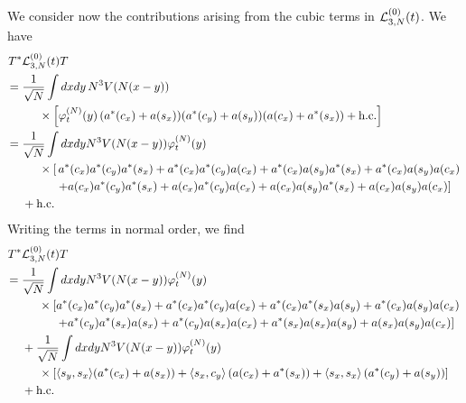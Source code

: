 \documentclass[11pt,a4paper,DIV11]{scrartcl}	%
\newcommand{\cL}{{\cal L}}
\begin{document}
We consider now the contributions arising from the cubic terms in $\cL^{(0)}_{3,N} (t)$.
We have
\[ \begin{split}
T^* & \cL_{3,N}^{(0)} (t) T \\ = \; & \frac{1}{\sqrt{N}} \int dx dy \, N^3 V(N (x-y)) \\ &\hspace{.5cm} \times \left[ \varphi_t^{(N)} (y) \, ( a^* (c_x) + a (s_x)) (a^* (c_y) + a (s_y)) (a (c_x) + a^* (s_x))  + \text{h.c.} \right] \\ = \; & \frac{1}{\sqrt{N}} \int dx dy N^3 V(N(x-y)) \varphi_t^{(N)} (y) \\ & \hspace{.5cm} 
\times \left[ \, a^* (c_x) a^* (c_y) a^* (s_x) + a^* (c_x) a^* (c_y) a(c_x) + a^* (c_x) a (s_y) a^* (s_x) +a^* (c_x) a (s_y) a (c_x)  \right. \\ & \hspace{1cm} \left. +  a (c_x) a^* (c_y) a^* (s_x) + a (c_x) a^* (c_y) a(c_x) + a (c_x) a (s_y) a^* (s_x) +a (c_x) a (s_y) a (c_x) \right]  \\ &+\text{h.c.} 
\end{split} \]
Writing the terms in normal order, we find
\begin{equation}\label{eq:cub-no} \begin{split} 
T^* &\cL_{3,N}^{(0)} (t) T  \\ = \; &\frac{1}{\sqrt{N}}  \int dx dy N^3 V(N(x-y)) \varphi_t^{(N)} (y) \\ & \hspace{.5cm}  \times \left[ a^* (c_x) a^* (c_y) a^* (s_x) + a^* (c_x) a^* (c_y) a(c_x) + a^* (c_x)  a^* (s_x) a (s_y) +a^* (c_x) a (s_y) a (c_x)  \right. \\ & \hspace{1cm} \left. +   a^* (c_y) a^* (s_x) a (s_x) + a^* (c_y) a (s_x)  a(c_x) + a^* (s_x) a (s_x) a (s_y)  +a (s_x) a (s_y) a (c_x) \right]  \\
&+ \frac{1}{\sqrt{N}} \int dx dy N^3 V (N (x-y)) \varphi_t^{(N)} (y) \\ &\hspace{.5cm} \times  \left[  \langle s_y , s_x \rangle (a^* (c_x) + a (s_x)) + \langle s_x, c_y \rangle \left( a (c_x) + a^* (s_x) \right) + \langle s_x, s_x \rangle \left(a^* (c_y) + a (s_y)\right) \right] 
\\ &+\text{h.c.}
\end{split} \end{equation}
\end{document}
